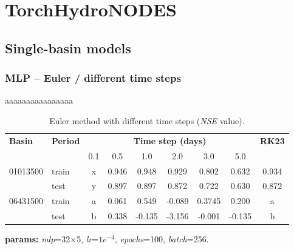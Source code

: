 \documentclass{article}
\begin{document}
\section{TorchHydroNODES}

\subsection{Single-basin models}

\subsubsection{MLP -- Euler / different time steps}

aaaaaaaaaaaaaaaa

\begin{table}[htbp]
    \centering
    \begin{threeparttable}

        \caption{Euler method with different time steps (\emph{NSE} value).}

        \begin{tabular}{llccccccc}
            \toprule
            \multirow{2}{*}{\textbf{Basin}} & \multirow{2}{*}{\textbf{\textbf{Period}}} & \multicolumn{6}{c}{\textbf{Time step (days)}} & \multirow{2}{*}{\textbf{RK23}} \\
            & & 0.1 & 0.5 & 1.0 & 2.0 & 3.0 & 5.0 \\
            \midrule
            \multirow{2}{*}{01013500} & train & x & 0.946 & 0.948 & 0.929 & 0.802 & 0.632 & 0.934 \\
                                      & test  & y & 0.897 & 0.897 & 0.872 & 0.722 & 0.630 & 0.872 \\
            \midrule
            \multirow{2}{*}{06431500} & train & a & 0.061 & 0.549 & -0.089 & 0.3745 & 0.200 & a \\
                                      & test  & b & 0.338 & -0.135 & -3.156 & -0.001 & -0.135 & b \\
            \bottomrule
        \end{tabular}

        \begin{tablenotes}
            \item \textbf{params:} \emph{mlp}=32$\times$5, \emph{lr}=$1e^{-4}$, \emph{epochs}=100, \emph{batch}=256.
        \end{tablenotes}

    \end{threeparttable}
\end{table}
\end{document}

